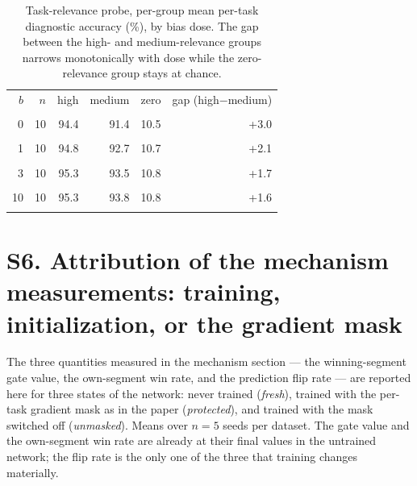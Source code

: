 \documentclass[10pt]{article}
\begin{document}
\begin{table}[h]
\centering\small
\caption{Task-relevance probe, per-group mean per-task diagnostic accuracy (\%), by bias dose. The gap between the high- and medium-relevance groups narrows monotonically with dose while the zero-relevance group stays at chance.}
\label{tab:sup-taskrel}
\begin{tabular}{rrrrrr}
\toprule
$b$ & $n$ & high & medium & zero & gap (high$-$medium) \\\\
\midrule
0 & 10 & 94.4 & 91.4 & 10.5 & +3.0 \\\\
1 & 10 & 94.8 & 92.7 & 10.7 & +2.1 \\\\
3 & 10 & 95.3 & 93.5 & 10.8 & +1.7 \\\\
10 & 10 & 95.3 & 93.8 & 10.8 & +1.6 \\\\
\bottomrule
\end{tabular}
\end{table}

\section{S6. Attribution of the mechanism measurements: training,
initialization, or the gradient mask}

\noindent The three quantities measured in the mechanism
section --- the winning-segment gate value, the own-segment win rate, and
the prediction flip rate --- are reported here for three states of the
network: never trained (\emph{fresh}), trained with the per-task gradient
mask as in the paper (\emph{protected}), and trained with the mask
switched off (\emph{unmasked}). Means over $n=5$ seeds per dataset. The
gate value and the own-segment win rate are already at their final values
in the untrained network; the flip rate is the only one of the three that
training changes materially.
\end{document}
